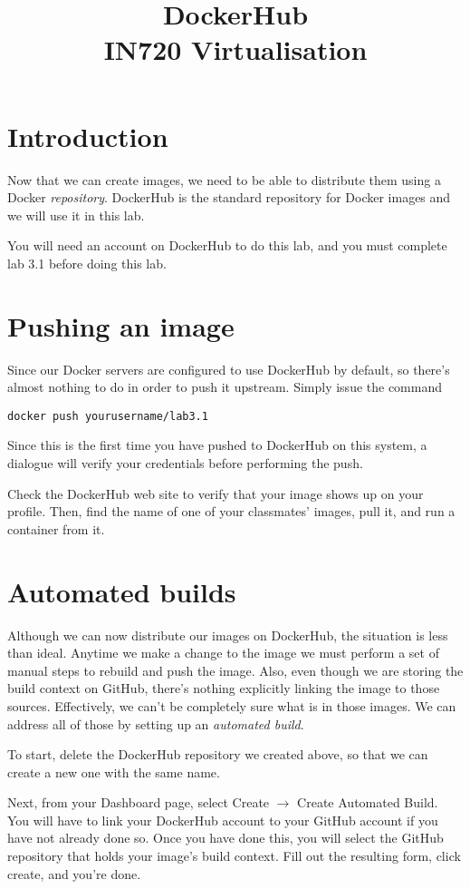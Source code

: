 \documentclass{article}
\begin{document}
\title{DockerHub\\ IN720 Virtualisation}
\date{}
\maketitle

\section*{Introduction}
Now that we can create images, we need to be able to distribute them using a Docker \emph{repository}.  DockerHub is the standard repository for Docker images and we will use it in this lab.

You will need an account on DockerHub to do this lab, and you must complete lab 3.1 before doing this lab.

\section{Pushing an image}
Since our Docker servers are configured to use DockerHub by default, so there's almost nothing to do in order to push it upstream.  Simply issue the command

\texttt{docker push yourusername/lab3.1}

Since this is the first time you have pushed to DockerHub on this system, a dialogue will verify your credentials before performing the push.

Check the DockerHub web site to verify that your image shows up on your profile.  Then, find the name of one of your classmates' images, pull it, and run a container from it.

\section{Automated builds}
Although we can now distribute our images on DockerHub, the situation is less than ideal.  Anytime we make a change to the image we must perform a set of manual steps to rebuild and push the image.  Also, even though we are storing the build context on GitHub, there's nothing explicitly linking the image to those sources. Effectively, we can't be completely sure what is in those images. We can address all of those by setting up an \emph{automated build}.

To start, delete the DockerHub repository we created above, so that we can create a new one with the same name.

Next, from your Dashboard page, select Create $\rightarrow$ Create Automated Build. You will have to link your DockerHub account to your GitHub account if you have not already done so. Once you have done this, you will select the GitHub repository that holds your image's build context. Fill out the resulting form, click create, and you're done.
\end{document}
